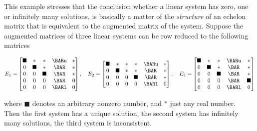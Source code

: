 \begin{ex}
\label{Ex:LinSystems:ZeroOneInfSolutions-2}
This example stresses that the conclusion whether a linear system has zero, one or infinitely many solutions,  is basically a matter of the \emph{structure} of an echelon matrix that is equivalent to the augmented matrix of the system.  
Suppose the augmented matrices of three linear systems can be row reduced to the following matrices

$$

  E_1 = 
\begin{bmatrix} \blacksquare & \ast & \ast & \BARu & \ast \\  
                         0  & \blacksquare & \ast & \BAR & \ast \\
                         0  &  0 &\blacksquare & \BAR & \ast \\ 
                         0  & 0 & 0 & \BAR & 0 \\
                         0  & 0 & 0 & \BARl & 0  \end{bmatrix} , 
                   \quad
  E_2 =   
\begin{bmatrix} \blacksquare & \ast & \ast & \ast & \BARu & \ast \\  
                         0  & \blacksquare & \ast & \ast & \BAR & \ast \\
                         0  &  0 & 0 &\blacksquare & \BAR & \ast \\
                         0  & 0 & 0 &0 & \BARl & 0  \end{bmatrix}, 
                         \quad
  E_3 =   
\begin{bmatrix} \blacksquare & \ast &  \ast & \BARu & \ast \\  
                         0  & \blacksquare & \ast & \BAR & \ast \\
                         0  & 0 & \blacksquare & \BAR &  \ast \\
                         0  & 0 & 0 & \BAR & \blacksquare  \\
                         0  & 0  &0 & \BARl & 0  \end{bmatrix}                       
$$

where  $\blacksquare$ denotes an arbitrary nonzero number, and  $\ast$ just any real number.\\
Then the first system has a unique solution, the second system has infinitely many solutions, the third system is inconsistent.
\end{ex}

